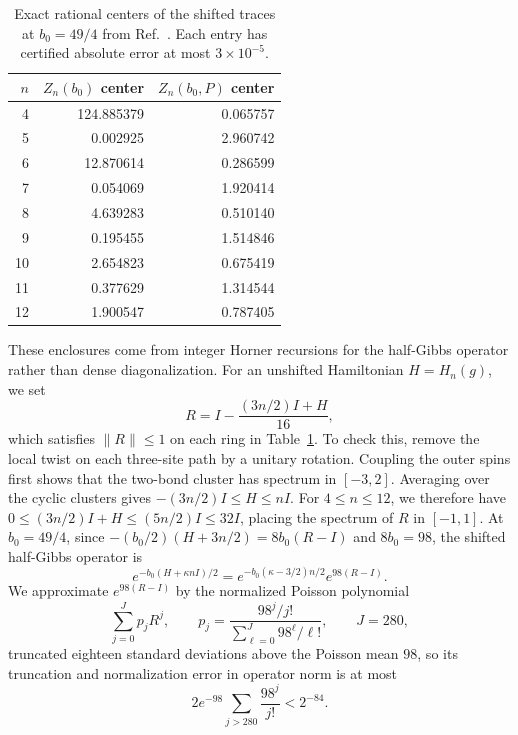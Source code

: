 \begin{table}[t]
 \caption{Exact rational centers of the shifted traces at $b_0=49/4$ from
 Ref.~\cite{OpenAI2026Periodic}. Each entry has certified absolute error
 at most $3\times10^{-5}$.}
 \label{cert:tab:traces}
 \begin{ruledtabular}
 \begin{tabular}{r rr}
 $n$ & $Z_n(b_0)$ center & $Z_n(b_0,P)$ center\\
 \hline
 4  & 124.885379 & 0.065757\\
 5  & 0.002925   & 2.960742\\
 6  & 12.870614  & 0.286599\\
 7  & 0.054069   & 1.920414\\
 8  & 4.639283   & 0.510140\\
 9  & 0.195455   & 1.514846\\
 10 & 2.654823   & 0.675419\\
 11 & 0.377629   & 1.314544\\
 12 & 1.900547   & 0.787405
 \end{tabular}
 \end{ruledtabular}
\end{table}

These enclosures come from integer Horner recursions for the half-Gibbs
operator rather than dense diagonalization. For an unshifted Hamiltonian
$H=H_n(g)$, we set
\begin{equation}
 R=I-\frac{(3n/2)I+H}{16},
 \label{cert:eq:uniformization}
\end{equation}
which satisfies $\|R\|\le1$ on each ring in Table~\ref{cert:tab:traces}.
To check this, remove the local twist on each three-site path by a
unitary rotation. Coupling the outer spins first shows that the
two-bond cluster has spectrum in $[-3,2]$. Averaging over the cyclic
clusters gives $-(3n/2)I\le H\le nI$. For $4\le n\le12$, we therefore
have $0\le(3n/2)I+H\le(5n/2)I\le32I$, placing the spectrum of $R$
in $[-1,1]$.
At $b_0=49/4$, since $-(b_0/2)(H+3n/2)=8b_0(R-I)$ and $8b_0=98$, the
shifted half-Gibbs operator is
\begin{equation}
 e^{-b_0(H+\kappa nI)/2}
 =e^{-b_0(\kappa-3/2)n/2}e^{98(R-I)}.
 \label{cert:eq:half-gibbs}
\end{equation}
We approximate $e^{98(R-I)}$ by the normalized Poisson polynomial
\begin{equation}
 \sum_{j=0}^{J}p_jR^j,\qquad
 p_j=\frac{98^j/j!}{\sum_{\ell=0}^{J}98^\ell/\ell!},
 \qquad J=280,
 \label{cert:eq:poisson}
\end{equation}
truncated eighteen standard deviations above the Poisson mean $98$, so
its truncation and normalization error in operator norm is at most
\begin{equation}
 2e^{-98}\sum_{j>280}\frac{98^j}{j!}<2^{-84}.
 \label{cert:eq:poisson-error}
\end{equation}

